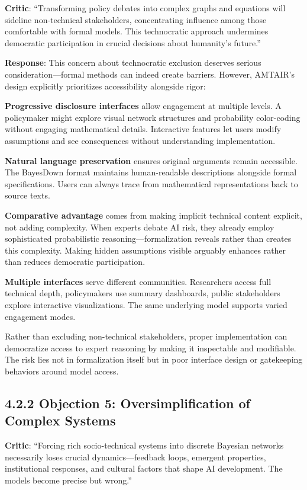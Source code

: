 \documentclass[
  11pt,
  letterpaper,
]{book}
\begin{document}
\textbf{Critic}: ``Transforming policy debates into complex graphs and
equations will sideline non-technical stakeholders, concentrating
influence among those comfortable with formal models. This technocratic
approach undermines democratic participation in crucial decisions about
humanity's future.''

\textbf{Response}: This concern about technocratic exclusion deserves
serious consideration---formal methods can indeed create barriers.
However, AMTAIR's design explicitly prioritizes accessibility alongside
rigor:

\textbf{Progressive disclosure interfaces} allow engagement at multiple
levels. A policymaker might explore visual network structures and
probability color-coding without engaging mathematical details.
Interactive features let users modify assumptions and see consequences
without understanding implementation.

\textbf{Natural language preservation} ensures original arguments remain
accessible. The BayesDown format maintains human-readable descriptions
alongside formal specifications. Users can always trace from
mathematical representations back to source texts.

\textbf{Comparative advantage} comes from making implicit technical
content explicit, not adding complexity. When experts debate AI risk,
they already employ sophisticated probabilistic
reasoning---formalization reveals rather than creates this complexity.
Making hidden assumptions visible arguably enhances rather than reduces
democratic participation.

\textbf{Multiple interfaces} serve different communities. Researchers
access full technical depth, policymakers use summary dashboards, public
stakeholders explore interactive visualizations. The same underlying
model supports varied engagement modes.

Rather than excluding non-technical stakeholders, proper implementation
can democratize access to expert reasoning by making it inspectable and
modifiable. The risk lies not in formalization itself but in poor
interface design or gatekeeping behaviors around model access.

\subsection{4.2.2 Objection 5: Oversimplification of Complex
Systems}\label{sec-oversimplification}

\textbf{Critic}: ``Forcing rich socio-technical systems into discrete
Bayesian networks necessarily loses crucial dynamics---feedback loops,
emergent properties, institutional responses, and cultural factors that
shape AI development. The models become precise but wrong.''
\end{document}
